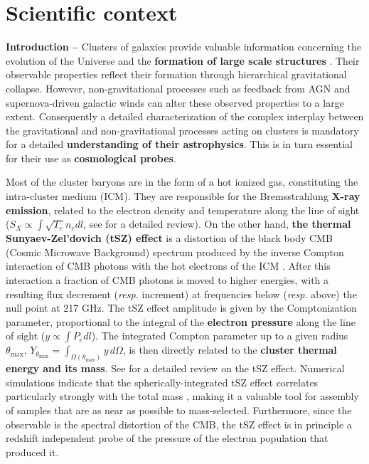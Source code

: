 \documentclass[11pt,a4paper,twoside,graphicx,color]{article}
\begin{document}
\section{Scientific context}
\vspace{-0.3cm}
{\bf \large Introduction -- } 
Clusters of galaxies provide valuable information concerning the evolution of the Universe and the {\bf formation of large scale structures} \cite{planck_cluster_count2013}. Their observable properties reflect their formation through hierarchical gravitational collapse. However, non-gravitational processes such as feedback from AGN and supernova-driven galactic winds can alter these observed properties to a large extent. Consequently a detailed characterization of the complex interplay between the gravitational and non-gravitational processes acting on clusters is mandatory for a detailed {\bf understanding of their astrophysics}. This is in turn essential for their use as {\bf cosmological probes}.%


Most of the cluster baryons are in the form of a hot ionized gas, constituting the intra-cluster medium (ICM). They are responsible for the Bremsstrahlung {\bf \mbox{X-ray} emission}, related to the electron density and temperature along the line of sight ($S_X \propto \int \sqrt{T_e} n_e dl$, see \cite{bohringer2010} for a detailed review). On the other hand, {\bf the thermal Sunyaev-Zel'dovich (tSZ) effect} is a distortion of the black body CMB (Cosmic Microwave Background) spectrum produced by the inverse Compton interaction of CMB photons with the hot electrons of the ICM \cite{sunyaev1972,sunyaev1980}. After this interaction a fraction of CMB photons is moved to higher energies, with a resulting flux decrement ({\it resp.} increment) at frequencies below ({\it resp.} above) the null point at 217 GHz. The tSZ effect amplitude is given by the Comptonization parameter, proportional to the integral of the {\bf electron pressure} along the line of sight ($y \propto \int P_e dl$). The integrated Compton parameter up to a given radius $\theta_{\mathrm{max}}$, $Y_{\theta_{\mathrm{max}}} = \int_{\Omega(\theta_{\mathrm{max}})} y\, d\Omega$, is then directly related to the {\bf cluster thermal energy and its mass}. See \cite{birkinshaw1999} for a detailed review on the tSZ effect. Numerical simulations indicate that the spherically-integrated tSZ effect correlates particularly strongly with the total mass \cite{das04}, making it a valuable tool for assembly of samples that are as near as possible to mass-selected. Furthermore, since the observable is the spectral distortion of the CMB, the tSZ effect is in principle a redshift independent probe of the pressure of the electron population that produced it. 
\end{document}
